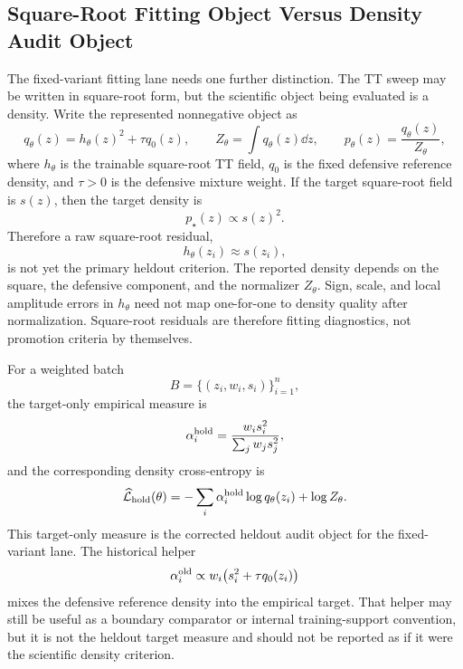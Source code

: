 \subsection{Square-Root Fitting Object Versus Density Audit Object}
\label{sec:bf-hd-squared-tt-density-audit}

The fixed-variant fitting lane needs one further distinction.  The TT sweep may
be written in square-root form, but the scientific object being evaluated is a
density.  Write the represented nonnegative object as
\begin{equation}
  q_\theta(z)=h_\theta(z)^2+\tau q_0(z),
  \qquad
  Z_\theta=\int q_\theta(z)\dd z,
  \qquad
  p_\theta(z)=\frac{q_\theta(z)}{Z_\theta},
  \label{eq:bf-hd-squared-tt-density-object}
\end{equation}
where \(h_\theta\) is the trainable square-root TT field, \(q_0\) is the fixed
defensive reference density, and \(\tau>0\) is the defensive mixture weight.
If the target square-root field is \(s(z)\), then the target density is
\begin{equation}
  p_\star(z)\propto s(z)^2.
  \label{eq:bf-hd-squared-tt-target-density}
\end{equation}
Therefore a raw square-root residual,
\begin{equation}
  h_\theta(z_i)\approx s(z_i),
  \label{eq:bf-hd-squared-tt-square-root-residual}
\end{equation}
is not yet the primary heldout criterion.  The reported density depends on the
square, the defensive component, and the normalizer \(Z_\theta\).  Sign, scale,
and local amplitude errors in \(h_\theta\) need not map one-for-one to density
quality after normalization.  Square-root residuals are therefore fitting
diagnostics, not promotion criteria by themselves.

For a weighted batch
\begin{equation}
  B=\{(z_i,w_i,s_i)\}_{i=1}^n,
  \label{eq:bf-hd-squared-tt-heldout-batch}
\end{equation}
the target-only empirical measure is
\begin{equation}
  \alpha_i^{\rm hold}
  =
  \frac{w_i s_i^2}{\sum_j w_j s_j^2},
  \label{eq:bf-hd-squared-tt-heldout-alpha}
\end{equation}
and the corresponding density cross-entropy is
\begin{equation}
  \widehat{\mathcal L}_{\rm hold}(\theta)
  =
  -\sum_i \alpha_i^{\rm hold}\log q_\theta(z_i)
  +\log Z_\theta.
  \label{eq:bf-hd-squared-tt-heldout-cross-entropy}
\end{equation}
This target-only measure is the corrected heldout audit object for the
fixed-variant lane.  The historical helper
\begin{equation}
  \alpha_i^{\rm old}
  \propto
  w_i\bigl(s_i^2+\tau q_0(z_i)\bigr)
  \label{eq:bf-hd-squared-tt-old-helper-alpha}
\end{equation}
mixes the defensive reference density into the empirical target.  That helper may
still be useful as a boundary comparator or internal training-support convention,
but it is not the heldout target measure and should not be reported as if it
were the scientific density criterion.

